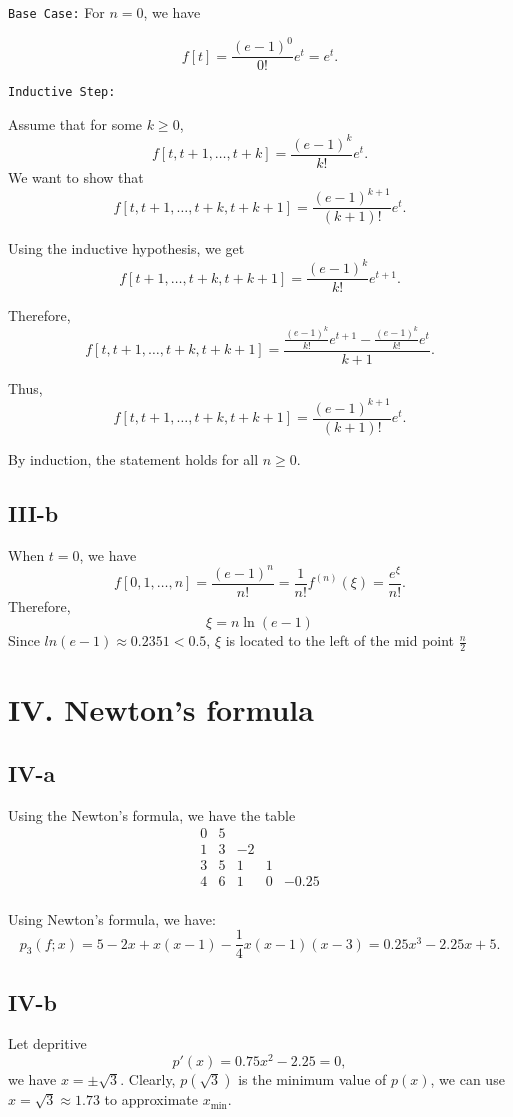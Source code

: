 \documentclass[a4paper]{article}
\begin{document}
\texttt{Base Case:}
For \(n = 0\), we have 

\[
f[t] = \frac{(e-1)^0}{0!}e^t = e^t.
\]

\texttt{Inductive Step:}

Assume that for some \(k \geq 0\), 
\[
f[t,t+1,\dots,t+k] = \frac{(e-1)^k}{k!}e^t.
\]
We want to show that 
\[
f[t,t+1,\dots,t+k,t+k+1] = \frac{(e-1)^{k+1}}{(k+1)!}e^t.
\]

Using the inductive hypothesis, we get
\[
f[t+1,\dots,t+k,t+k+1] = \frac{(e-1)^k}{k!}e^{t+1}.
\]

Therefore,
\[
f[t,t+1,\dots,t+k,t+k+1] = \frac{\frac{(e-1)^k}{k!}e^{t+1} - \frac{(e-1)^k}{k!}e^t}{k+1}.
\]

Thus,
\[
f[t,t+1,\dots,t+k,t+k+1] = \frac{(e-1)^{k+1}}{(k+1)!}e^t.
\]

By induction, the statement holds for all \(n \geq 0\).

\subsection*{III-b}

When $t = 0$, we have
\[
    f[0,1,\dots,n] = \frac{(e-1)^n}{n!} = \frac{1}{n!}f^{(n)}(\xi) = \frac{e^{\xi}}{n!}.
\]
Therefore,
\[
    \xi = n\ln (e-1) 
\]
Since $ln (e-1) \approx 0.2351 < 0.5$, $\xi$ is located to the left of the mid point $\frac{n}{2}$
\section*{IV. Newton's formula}
\subsection*{IV-a}
Using the Newton's formula, we have the table
\[
\begin{array}{c|cccc}

0 & 5 &  &  &  \\
1 & 3 & -2 &  & \\
3 & 5 & 1 & 1& \\
4 & 6 & 1 &0 & -0.25\\
\end{array}
\]

Using Newton's formula, we have:
\[
p_3(f;x) = 5 - 2x + x(x-1) - \frac{1}{4}x(x-1)(x-3) = 0.25x^3 - 2.25x + 5.
\]

\subsection*{IV-b}
Let depritive \[p'(x) = 0.75x^2 - 2.25 = 0,\] we have $x = \pm \sqrt{3}$. Clearly, $p(\sqrt{3})$ is the minimum value of $p(x)$, we can use $x = \sqrt{3} \approx 1.73$ to approximate $x_{\min}$.
\end{document}
